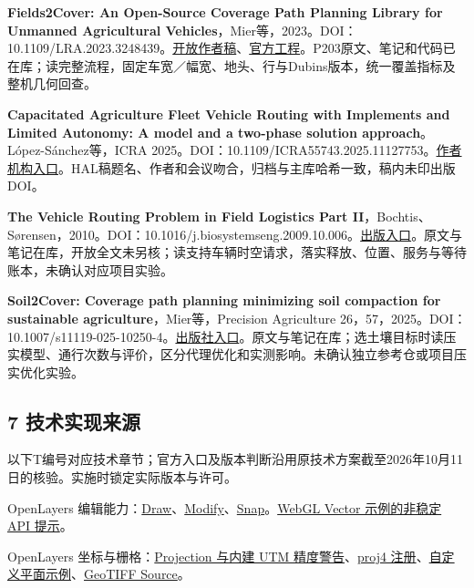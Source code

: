 \documentclass[11pt,a4paper]{article}
\newcommand{\bodytext}[1]{#1\par}
\newcommand{\sourcetext}[1]{{\fontsize{9.2}{14}\selectfont\color{Muted}#1\par}}
\newcommand{\referencetext}[1]{{\fontsize{9.4}{14.2}\selectfont#1\par}}
\begin{document}
\sourcetext{\textbf{Fields2Cover: An Open-Source Coverage Path Planning Library for Unmanned Agricultural Vehicles}，Mier等，2023。DOI：10.1109/\allowbreak{}LRA.2023.3248439。\href{https://arxiv.org/abs/2210.07838}{开放作者稿}、\href{https://github.com/Fields2Cover/Fields2Cover}{官方工程}。P203原文、笔记和代码已在库；读完整流程，固定车宽／幅宽、地头、行与Dubins版本，统一覆盖指标及整机几何回查。}
\sourcetext{\textbf{Capacitated Agriculture Fleet Vehicle Routing with Implements and Limited Autonomy: A model and a two-phase solution approach}。López-Sánchez等，ICRA 2025。DOI：10.1109/\allowbreak{}ICRA55743.2025.11127753。\href{https://burjcdigital.urjc.es/items/4bfae71f-638f-4c78-80e5-79b8274f5a39}{作者机构入口}。HAL稿题名、作者和会议吻合，归档与主库哈希一致，稿内未印出版DOI。}
\sourcetext{\textbf{The Vehicle Routing Problem in Field Logistics Part II}，Bochtis、Sørensen，2010。DOI：10.1016/\allowbreak{}j.biosystemseng.2009.10.006。\href{https://doi.org/10.1016/j.biosystemseng.2009.10.006}{出版入口}。原文与笔记在库，开放全文未另核；读支持车辆时空请求，落实释放、位置、服务与等待账本，未确认对应项目实验。}
\sourcetext{\textbf{Soil2Cover: Coverage path planning minimizing soil compaction for sustainable agriculture}，Mier等，Precision Agriculture 26，57，2025。DOI：10.1007/\allowbreak{}s11119-025-10250-4。\href{https://doi.org/10.1007/s11119-025-10250-4}{出版社入口}。原文与笔记在库；选土壤目标时读压实模型、通行次数与评价，区分代理优化和实测影响。未确认独立参考仓或项目压实优化实验。}
\subsection{7  技术实现来源}
\bodytext{以下T编号对应技术章节；官方入口及版本判断沿用原技术方案截至2026年10月11日的核验。实施时锁定实际版本与许可。}
\referencetext{[T1] OpenLayers 编辑能力：\href{https://openlayers.org/en/latest/apidoc/module-ol\_interaction\_Draw-Draw.html}{Draw}、\href{https://openlayers.org/en/latest/apidoc/module-ol\_interaction\_Modify-Modify.html}{Modify}、\href{https://openlayers.org/en/latest/apidoc/module-ol\_interaction\_Snap-Snap.html}{Snap}。\href{https://openlayers.org/en/latest/examples/webgl-vector-layer.html}{WebGL Vector 示例的非稳定 API 提示}。}
\referencetext{[T2] OpenLayers 坐标与栅格：\href{https://openlayers.org/en/latest/apidoc/module-ol\_proj\_Projection-Projection.html}{Projection 与内建 UTM 精度警告}、\href{https://openlayers.org/en/latest/apidoc/module-ol\_proj\_proj4.html}{proj4 注册}、\href{https://openlayers.org/en/latest/examples/static-image.html}{自定义平面示例}、\href{https://openlayers.org/en/latest/apidoc/module-ol\_source\_GeoTIFF-GeoTIFFSource.html}{GeoTIFF Source}。}
\end{document}
